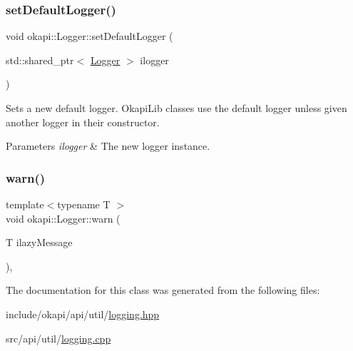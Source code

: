\subsubsection{\texorpdfstring{setDefaultLogger()}{setDefaultLogger()}}
{\footnotesize\ttfamily void okapi\+::\+Logger\+::set\+Default\+Logger (\begin{DoxyParamCaption}\item[{std\+::shared\+\_\+ptr$<$ \mbox{\hyperlink{classokapi_1_1Logger}{Logger}} $>$}]{ilogger }\end{DoxyParamCaption})\hspace{0.3cm}{\ttfamily [static]}}

Sets a new default logger. Okapi\+Lib classes use the default logger unless given another logger in their constructor.


\begin{DoxyParams}{Parameters}
{\em ilogger} & The new logger instance. \\
\hline
\end{DoxyParams}
\mbox{\label{classokapi_1_1Logger_a46199a0d137b7bd237a70ca5da2da14c}} 
\subsubsection{\texorpdfstring{warn()}{warn()}}
{\footnotesize\ttfamily template$<$typename T $>$ \\
void okapi\+::\+Logger\+::warn (\begin{DoxyParamCaption}\item[{T}]{ilazy\+Message }\end{DoxyParamCaption})\hspace{0.3cm}{\ttfamily [inline]}, {\ttfamily [noexcept]}}



The documentation for this class was generated from the following files\+:\begin{DoxyCompactItemize}
\item 
include/okapi/api/util/\mbox{\hyperlink{logging_8hpp}{logging.\+hpp}}\item 
src/api/util/\mbox{\hyperlink{logging_8cpp}{logging.\+cpp}}\end{DoxyCompactItemize}
